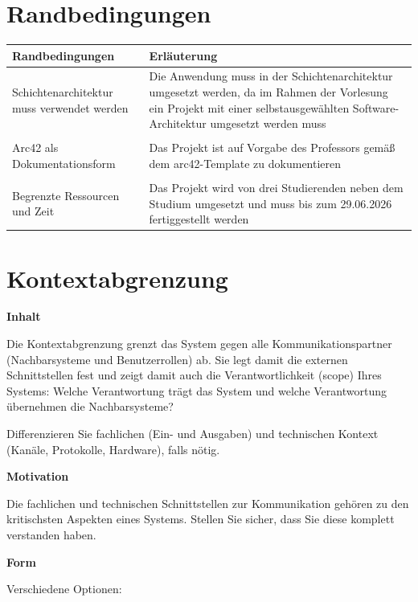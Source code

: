 \documentclass[a4paper,12pt]{article}
\begin{document}
\section{Randbedingungen}

\begin{longtable}[]{@{}
  >{\raggedright\arraybackslash}p{}
  >{\raggedright\arraybackslash}p{}@{}}
\toprule\noalign{}
\textbf{Randbedingungen} & \textbf{Erläuterung} \\
\midrule\noalign{}
\endhead
\bottomrule\noalign{}
\endlastfoot
Schichtenarchitektur muss verwendet werden &  Die Anwendung muss in der Schichtenarchitektur umgesetzt werden, da im Rahmen der Vorlesung ein Projekt mit einer selbstausgewählten Software-Architektur umgesetzt werden muss \\\\
Arc42 als Dokumentationsform & Das Projekt ist auf Vorgabe des Professors gemäß dem arc42-Template zu dokumentieren \\\\
Begrenzte Ressourcen und Zeit & Das Projekt wird von drei Studierenden neben dem Studium umgesetzt und muss bis zum 29.06.2026 fertiggestellt werden \\
\end{longtable}
\newpage
\section{Kontextabgrenzung}\label{section-context-and-scope}

\textbf{Inhalt}

Die Kontextabgrenzung grenzt das System gegen alle Kommunikationspartner
(Nachbarsysteme und Benutzerrollen) ab. Sie legt damit die externen
Schnittstellen fest und zeigt damit auch die Verantwortlichkeit (scope)
Ihres Systems: Welche Verantwortung trägt das System und welche
Verantwortung übernehmen die Nachbarsysteme?

Differenzieren Sie fachlichen (Ein- und Ausgaben) und technischen
Kontext (Kanäle, Protokolle, Hardware), falls nötig.

\textbf{Motivation}

Die fachlichen und technischen Schnittstellen zur Kommunikation gehören
zu den kritischsten Aspekten eines Systems. Stellen Sie sicher, dass Sie
diese komplett verstanden haben.

\textbf{Form}

Verschiedene Optionen:
\end{document}
